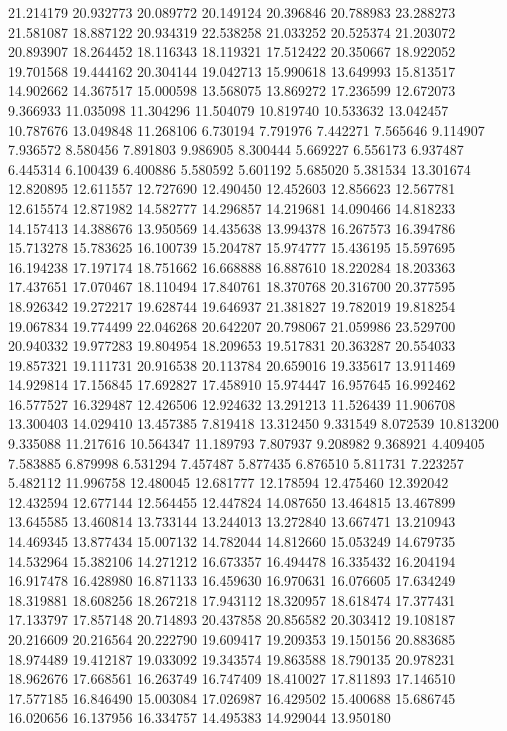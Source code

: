 21.214179
20.932773
20.089772
20.149124
20.396846
20.788983
23.288273
21.581087
18.887122
20.934319
22.538258
21.033252
20.525374
21.203072
20.893907
18.264452
18.116343
18.119321
17.512422
20.350667
18.922052
19.701568
19.444162
20.304144
19.042713
15.990618
13.649993
15.813517
14.902662
14.367517
15.000598
13.568075
13.869272
17.236599
12.672073
9.366933
11.035098
11.304296
11.504079
10.819740
10.533632
13.042457
10.787676
13.049848
11.268106
6.730194
7.791976
7.442271
7.565646
9.114907
7.936572
8.580456
7.891803
9.986905
8.300444
5.669227
6.556173
6.937487
6.445314
6.100439
6.400886
5.580592
5.601192
5.685020
5.381534
13.301674
12.820895
12.611557
12.727690
12.490450
12.452603
12.856623
12.567781
12.615574
12.871982
14.582777
14.296857
14.219681
14.090466
14.818233
14.157413
14.388676
13.950569
14.435638
13.994378
16.267573
16.394786
15.713278
15.783625
16.100739
15.204787
15.974777
15.436195
15.597695
16.194238
17.197174
18.751662
16.668888
16.887610
18.220284
18.203363
17.437651
17.070467
18.110494
17.840761
18.370768
20.316700
20.377595
18.926342
19.272217
19.628744
19.646937
21.381827
19.782019
19.818254
19.067834
19.774499
22.046268
20.642207
20.798067
21.059986
23.529700
20.940332
19.977283
19.804954
18.209653
19.517831
20.363287
20.554033
19.857321
19.111731
20.916538
20.113784
20.659016
19.335617
13.911469
14.929814
17.156845
17.692827
17.458910
15.974447
16.957645
16.992462
16.577527
16.329487
12.426506
12.924632
13.291213
11.526439
11.906708
13.300403
14.029410
13.457385
7.819418
13.312450
9.331549
8.072539
10.813200
9.335088
11.217616
10.564347
11.189793
7.807937
9.208982
9.368921
4.409405
7.583885
6.879998
6.531294
7.457487
5.877435
6.876510
5.811731
7.223257
5.482112
11.996758
12.480045
12.681777
12.178594
12.475460
12.392042
12.432594
12.677144
12.564455
12.447824
14.087650
13.464815
13.467899
13.645585
13.460814
13.733144
13.244013
13.272840
13.667471
13.210943
14.469345
13.877434
15.007132
14.782044
14.812660
15.053249
14.679735
14.532964
15.382106
14.271212
16.673357
16.494478
16.335432
16.204194
16.917478
16.428980
16.871133
16.459630
16.970631
16.076605
17.634249
18.319881
18.608256
18.267218
17.943112
18.320957
18.618474
17.377431
17.133797
17.857148
20.714893
20.437858
20.856582
20.303412
19.108187
20.216609
20.216564
20.222790
19.609417
19.209353
19.150156
20.883685
18.974489
19.412187
19.033092
19.343574
19.863588
18.790135
20.978231
18.962676
17.668561
16.263749
16.747409
18.410027
17.811893
17.146510
17.577185
16.846490
15.003084
17.026987
16.429502
15.400688
15.686745
16.020656
16.137956
16.334757
14.495383
14.929044
13.950180
